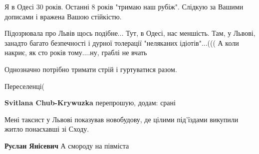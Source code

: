\begin{itemize}
Я в Одесі 30 років. Останні 8 років "тримаю наш рубіж". Слідкую за Вашими
дописами і вражена Вашою стійкістю.

Підозрювала про Львів щось подібне... Тут, в Одесі, нас меншість. Там, у
Львові, занадто багато безпечності і дурної толерації "неляканих ідіотів"...(((
А коли накриє, як сто років тому....ну, граблі не вчать

 
Однозначно потрібно тримати стрій і гуртуватися разом.

 
Переселенці(

\begin{itemize}
 
\textbf{Svitlana Chub-Krywuzka} перепрошую, додам: срані
\end{itemize}

 
Мені таксист у Львові показував новобудову, де цілими під'їздами викупили житло понаєхавші зі Сходу.

\begin{itemize}
 
\textbf{Руслан Янісевич} А смороду на півміста

 

\end{itemize}
\end{itemize}
